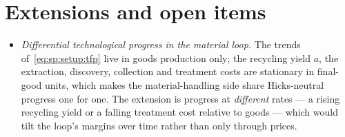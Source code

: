 \section{Extensions and open items}\label{sec:app:extensions}

\begin{itemize}
    \item \emph{Differential technological progress in the material loop.} The trends
    of~\eqref{eq:sp:setup:tfp} live in goods production only; the recycling yield $a$, the
    extraction, discovery, collection and treatment costs are stationary in final-good units,
    which makes the material-handling side share Hicks-neutral progress one for one. The
    extension is progress at \emph{different} rates --- a rising recycling yield or a falling
    treatment cost relative to goods --- which would tilt the loop's margins over time rather
    than only through prices.
\end{itemize}
